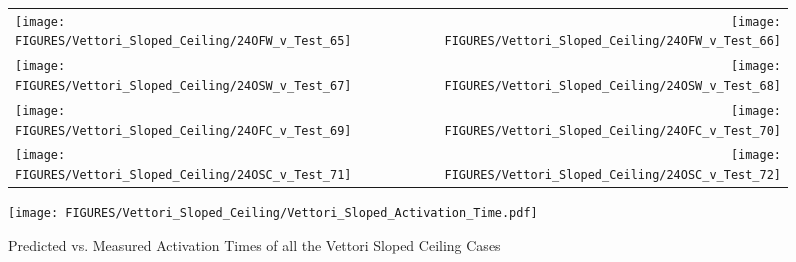 \begin{figure}[p]
\begin{tabular*}{\textwidth}{l@{\extracolsep{\fill}}r}
\texttt{[image: FIGURES/Vettori\_Sloped\_Ceiling/24OFW\_v\_Test\_65]} &
\texttt{[image: FIGURES/Vettori\_Sloped\_Ceiling/24OFW\_v\_Test\_66]} \\
\texttt{[image: FIGURES/Vettori\_Sloped\_Ceiling/24OSW\_v\_Test\_67]} &
\texttt{[image: FIGURES/Vettori\_Sloped\_Ceiling/24OSW\_v\_Test\_68]} \\
\texttt{[image: FIGURES/Vettori\_Sloped\_Ceiling/24OFC\_v\_Test\_69]} &
\texttt{[image: FIGURES/Vettori\_Sloped\_Ceiling/24OFC\_v\_Test\_70]} \\
\texttt{[image: FIGURES/Vettori\_Sloped\_Ceiling/24OSC\_v\_Test\_71]} &
\texttt{[image: FIGURES/Vettori\_Sloped\_Ceiling/24OSC\_v\_Test\_72]} \\
\end{tabular*}
\label{Vettori_Sloped_9}
\end{figure}

\begin{figure}[p]
\begin{center}
\texttt{[image: FIGURES/Vettori\_Sloped\_Ceiling/Vettori\_Sloped\_Activation\_Time.pdf]}
\end{center}
\caption{Predicted vs. Measured Activation Times of all the Vettori Sloped Ceiling Cases}
\label{Vettori_Sloped_Activation}
\end{figure}
